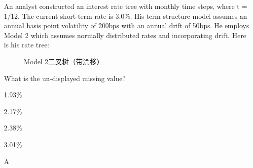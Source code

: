 \documentclass{article}
\newcounter{question} %
\begin{document}
\begin{question}
    An analyst constructed an interest rate tree with monthly time steps, where t = 1/12. The
    current short-term rate is 3.0\%. His term structure model assumes an annual basis point
    volatility of 200bps with an annual drift of 50bps. He employs Model 2 which assumes normally
    distributed rates and incorporating drift. Here is his rate tree:

    \begin{figure}[H]
        \centering
        \caption{Model 2二叉树（带漂移）}
    \end{figure}

    What is the un-displayed missing value?
\end{question}

\begin{choices}
    \item 1.93\%
    \item 2.17\%
    \item 2.38\%
    \item 3.01\%
\end{choices}

\begin{correctanswer}
    A
\end{correctanswer}
\end{document}
